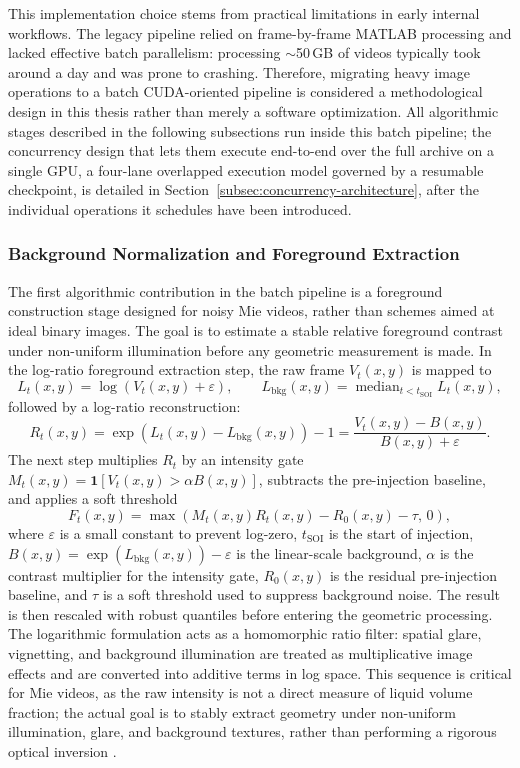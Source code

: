 This implementation choice stems from practical limitations in early internal workflows. The legacy pipeline relied on frame-by-frame MATLAB processing and lacked effective batch parallelism: processing $\sim$50\,GB of videos typically took around a day and was prone to crashing.
Therefore, migrating heavy image operations to a batch CUDA-oriented pipeline is considered a methodological design in this thesis rather than merely a software optimization. All algorithmic stages described in the following subsections run inside this batch pipeline; the concurrency design that lets them execute end-to-end over the full archive on a single GPU, a four-lane overlapped execution model governed by a resumable checkpoint, is detailed in Section~\ref{subsec:concurrency-architecture}, after the individual operations it schedules have been introduced.

\subsubsection{Background Normalization and Foreground Extraction}\label{subsec:background-normalization}

The first algorithmic contribution in the batch pipeline is a foreground construction stage designed for noisy Mie videos, rather than schemes aimed at ideal binary images.
The goal is to estimate a stable relative foreground contrast under non-uniform illumination before any geometric measurement is made.
In the log-ratio foreground extraction step, the raw frame \(V_t(x,y)\) is mapped to
\[
L_t(x,y)=\log(V_t(x,y)+\varepsilon),
\qquad
L_{\mathrm{bkg}}(x,y)=\operatorname{median}_{t<t_{\mathrm{SOI}}} L_t(x,y),
\]
followed by a log-ratio reconstruction:
\[
R_t(x,y)=\exp\!\left(L_t(x,y)-L_{\mathrm{bkg}}(x,y)\right)-1
=\frac{V_t(x,y)-B(x,y)}{B(x,y)+\varepsilon}.
\]
The next step multiplies \(R_t\) by an intensity gate \(M_t(x,y)=\mathbf{1}[V_t(x,y)>\alpha B(x,y)]\), subtracts the pre-injection baseline, and applies a soft threshold
\[
F_t(x,y)=\max\!\left(M_t(x,y)R_t(x,y)-R_0(x,y)-\tau,\,0\right),
\]
where \(\varepsilon\) is a small constant to prevent log-zero, \(t_{\mathrm{SOI}}\) is the start of injection, \(B(x,y)=\exp(L_{\mathrm{bkg}}(x,y))-\varepsilon\) is the linear-scale background, \(\alpha\) is the contrast multiplier for the intensity gate, \(R_0(x,y)\) is the residual pre-injection baseline, and \(\tau\) is a soft threshold used to suppress background noise.
The result is then rescaled with robust quantiles before entering the geometric processing.
The logarithmic formulation acts as a homomorphic ratio filter: spatial glare, vignetting, and background illumination are treated as multiplicative image effects and are converted into additive terms in log space.
This sequence is critical for Mie videos, as the raw intensity is not a direct measure of liquid volume fraction; the actual goal is to stably extract geometry under non-uniform illumination, glare, and background textures, rather than performing a rigorous optical inversion \cite{BohrenHuffman2004,Linne2013SprayImaging,GonzalezWoodsDIP}.

